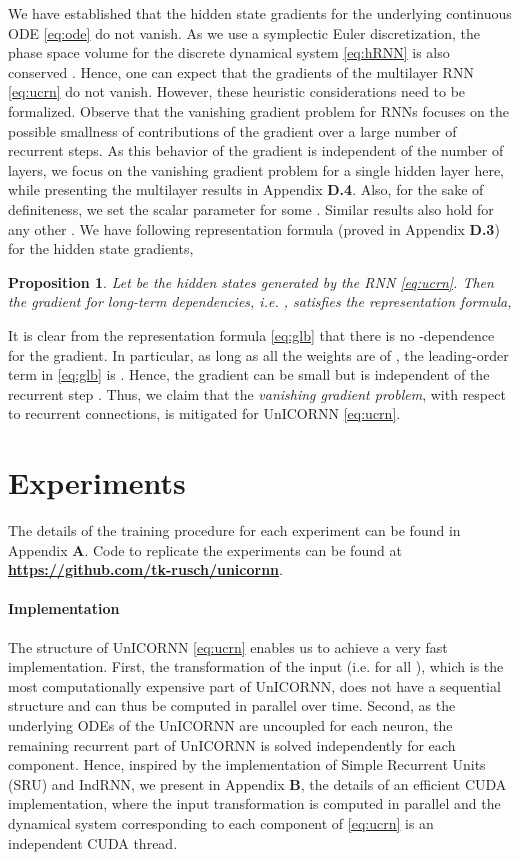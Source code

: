 \documentclass[a4paper]{article}
\newtheorem{proposition}[theorem]{Proposition}
\begin{document}
We have established that the hidden state gradients for the underlying continuous ODE \eqref{eq:ode} do not vanish. As we use a symplectic Euler discretization, the phase space volume for the discrete dynamical system \eqref{eq:hRNN} is also conserved \cite{ss1,HLW1}. Hence, one can expect that the gradients of the multilayer RNN \eqref{eq:ucrn} do not vanish. However, these heuristic considerations need to be formalized. Observe that the vanishing gradient problem for RNNs focuses on the possible smallness of contributions of the gradient over a large number of recurrent steps. As this behavior of the gradient is independent of the number of layers, we focus on the vanishing gradient problem for a single hidden layer here, while presenting the multilayer results in Appendix {\bf D.4}. Also, for the sake of definiteness, we set the scalar parameter  for some . Similar results also hold for any other . We have following representation formula (proved in Appendix {\bf D.3}) for the hidden state gradients,
\begin{proposition}
\label{prop:4}
Let  be the hidden states generated by the RNN \eqref{eq:ucrn}.  Then the gradient for long-term dependencies, i.e. , satisfies the representation formula,

\end{proposition}
It is clear from the representation formula \eqref{eq:glb} that there is no -dependence for the gradient. In particular, as long as all the weights are of , the leading-order term in \eqref{eq:glb} is . Hence, the gradient can be small but is independent of the recurrent step . Thus, we claim that the \emph{vanishing gradient problem}, with respect to recurrent connections, is mitigated for UnICORNN \eqref{eq:ucrn}.  
\section{Experiments}
The details of the training procedure
for each experiment can be found in Appendix {\bf A}. Code to replicate the experiments can be found at
\href{https://github.com/tk-rusch/unicornn}{\textbf{https://github.com/tk-rusch/unicornn}}.
\paragraph{Implementation}
The structure of UnICORNN \eqref{eq:ucrn} enables us to achieve a very fast implementation. First, the transformation of the input (i.e.  for all ), which is the most computationally expensive part of UnICORNN, does not have a sequential structure and can thus be computed in parallel over time. Second, as the underlying ODEs of the UnICORNN are uncoupled for each neuron, the remaining recurrent part of UnICORNN is solved independently for each component. Hence, inspired by the implementation of Simple Recurrent Units (SRU) \citep{sru} and IndRNN, we present in Appendix {\bf B}, the details of an efficient CUDA implementation, where the input transformation is computed in parallel and the dynamical system corresponding to each component of \eqref{eq:ucrn} is an independent CUDA thread. 
\end{document}
